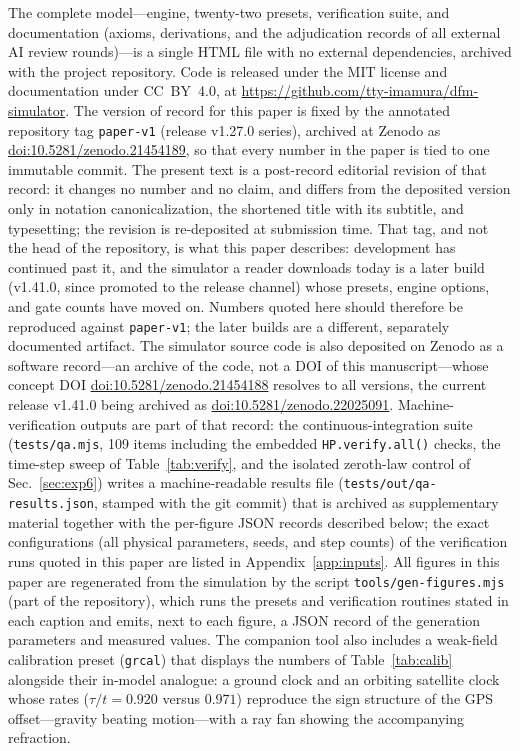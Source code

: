 \documentclass[aps,reprint,amsmath,amssymb,nofootinbib,superscriptaddress,floatfix]{revtex4-2}
\begin{document}
The complete model---engine, twenty-two presets, verification suite,
and documentation (axioms, derivations, and the adjudication records
of all external AI review rounds)---is a single HTML file with no
external dependencies, archived with the project repository.
Code is released under the MIT license and documentation under
CC~BY~4.0, at \url{https://github.com/tty-imamura/dfm-simulator}.
The version of record for this paper is fixed by the annotated
repository tag \texttt{paper-v1} (release v1.27.0 series), archived at
Zenodo as
\href{https://doi.org/10.5281/zenodo.21454189}
{doi:10.5281/zenodo.21454189}, so that every number in the paper is
tied to one immutable commit.
The present text is a post-record editorial revision of that record: it
changes no number and no claim, and differs from the deposited version
only in notation canonicalization, the shortened title with its
subtitle, and typesetting; the revision is re-deposited at submission
time.
That tag, and not the head of the repository, is what this paper
describes: development has continued past it, and the simulator a
reader downloads today is a later build (v1.41.0, since promoted to the
release channel) whose presets, engine options, and gate counts
have moved on.
Numbers quoted here should therefore be reproduced against
\texttt{paper-v1}; the later builds are a different, separately
documented artifact.
The simulator source code is also deposited on Zenodo as a software
record---an archive of the code, not a DOI of this manuscript---whose
concept DOI
\href{https://doi.org/10.5281/zenodo.21454188}
{doi:10.5281/zenodo.21454188} resolves to all versions, the current
release v1.41.0 being archived as
\href{https://doi.org/10.5281/zenodo.22025091}
{doi:10.5281/zenodo.22025091}.
Machine-verification outputs are part of that record: the
continuous-integration suite (\texttt{tests/qa.mjs}, 109 items
including the embedded \texttt{HP.verify.all()} checks, the time-step
sweep of Table~\ref{tab:verify}, and the isolated zeroth-law control
of Sec.~\ref{sec:exp6}) writes a machine-readable results file
(\texttt{tests/out/qa-results.json}, stamped with the git commit) that
is archived as supplementary material together with the per-figure
JSON records described below; the exact configurations (all physical
parameters, seeds, and step counts) of the verification runs quoted in
this paper are listed in Appendix~\ref{app:inputs}.
All figures in this paper are regenerated from the simulation by the
script \texttt{tools/gen-figures.mjs} (part of the repository), which
runs the presets and verification routines stated in each caption and
emits, next to each figure, a JSON record of the generation parameters
and measured values.
The companion tool also includes a weak-field calibration preset
(\texttt{grcal}) that displays the numbers of Table~\ref{tab:calib}
alongside their in-model analogue: a ground clock and an orbiting
satellite clock whose rates ($\tau/t = 0.920$ versus $0.971$)
reproduce the sign structure of the GPS offset---gravity beating
motion---with a ray fan showing the accompanying refraction.
\end{document}
